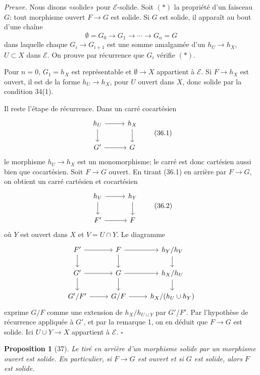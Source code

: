 \documentclass[11pt]{article}
\theoremstyle{deligne}
\newtheorem*{proposition*}{Proposition}
\newenvironment{proofdel}{\noindent\textit{Preuve.}}{\hfill$\square$}
\begin{document}
\begin{proofdel}
Nous disons «solide» pour \(\mathcal E\)-solide. Soit \((*)\) la propriété d'un faisceau \(G\): tout morphisme ouvert \(F\to G\) est solide. Si \(G\) est solide, il apparaît au bout d'une chaîne
\[
\emptyset=G_0\to G_1\to\cdots\to G_n=G
\]
dans laquelle chaque \(G_i\to G_{i+1}\) est une somme amalgamée d'un \(h_U\to h_X\), \(U\subset X\) dans \(\mathcal E\). On prouve par récurrence que \(G_i\) vérifie \((*)\).

Pour \(n=0\), \(G_1=h_X\) est représentable et \(\emptyset\to X\) appartient à \(\mathcal E\). Si \(F\to h_X\) est ouvert, il est de la forme \(h_U\to h_X\), pour \(U\) ouvert dans \(X\), donc solide par la condition 34(1).

Il reste l'étape de récurrence. Dans un carré cocartésien
\[
\begin{tikzcd}[column sep=2.8em,row sep=1.8em]
h_U \arrow[r] \arrow[d] & h_X \arrow[d]\\
G' \arrow[r] & G
\end{tikzcd}
\tag{36.1}
\]
le morphisme \(h_U\to h_X\) est un monomorphisme; le carré est donc cartésien aussi bien que cocartésien. Soit \(F\to G\) ouvert. En tirant (36.1) en arrière par \(F\to G\), on obtient un carré cartésien et cocartésien
\[
\begin{tikzcd}[column sep=2.8em,row sep=1.8em]
h_V \arrow[r] \arrow[d] & h_Y \arrow[d]\\
F' \arrow[r] & F
\end{tikzcd}
\tag{36.2}
\]
où \(Y\) est ouvert dans \(X\) et \(V=U\cap Y\). Le diagramme
\[
\begin{tikzcd}[column sep=2.6em,row sep=1.55em]
F' \arrow[r] \arrow[d] & F \arrow[r] \arrow[d] & h_Y/h_V \arrow[d]\\
G' \arrow[r] \arrow[d] & G \arrow[r] \arrow[d] & h_X/h_U \arrow[d]\\
G'/F' \arrow[r] & G/F \arrow[r] & h_X/(h_U\cup h_Y)
\end{tikzcd}
\]
exprime \(G/F\) comme une extension de \(h_X/h_{U\cup Y}\) par \(G'/F'\). Par l'hypothèse de récurrence appliquée à \(G'\), et par la remarque 1, on en déduit que \(F\to G\) est solide. Ici \(U\cup Y\to X\) appartient à \(\mathcal E\).
\end{proofdel}

\begin{proposition*}[37]
Le tiré en arrière d'un morphisme solide par un morphisme ouvert est solide. En particulier, si \(F\to G\) est ouvert et si \(G\) est solide, alors \(F\) est solide.
\end{proposition*}
\end{document}
